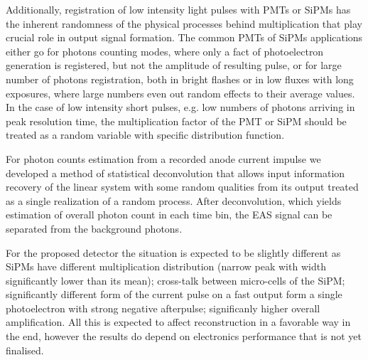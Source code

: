 \documentclass[a4paper,11pt]{article}
\begin{document}


Additionally, registration of low intensity light pulses with PMTs or SiPMs has the inherent randomness of the physical processes behind multiplication that play crucial role in output signal formation. The common PMTs of SiPMs applications either go for photons counting modes, where only a fact of photoelectron generation is registered, but not the amplitude of resulting pulse, or for large number of photons registration, both in bright flashes or in low fluxes with long exposures, where large numbers even out random effects to their average values. In the case of low intensity short pulses, e.g. low numbers of photons arriving in peak resolution time, the multiplication factor of the PMT or SiPM should be treated as a random variable with specific distribution function.

For photon counts estimation from a recorded anode current impulse we developed a method of statistical deconvolution that allows input information recovery of the linear system with some random qualities from its output treated as a single realization of a random process. After deconvolution, which yields estimation of overall photon count in each time bin, the EAS signal can be separated from the background photons.

For the proposed detector the situation is expected to be slightly different as SiPMs have different multiplication distribution (narrow peak with width significantly lower than its mean); cross-talk between micro-cells of the SiPM; significantly different form of the current pulse on a fast output form a single photoelectron with strong negative afterpulse; significanly higher overall amplification. All this is expected to affect reconstruction in a favorable way in the end, however the results do depend on electronics performance that is not yet finalised.
\end{document}
